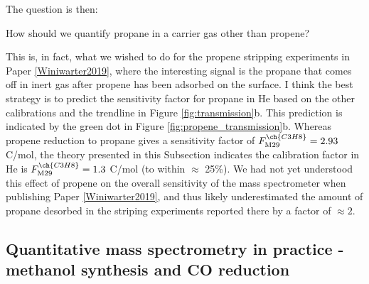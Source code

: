 The question is then: 
\begin{question} 
	How should we quantify propane in a carrier gas other than propene?
\end{question}
This is, in fact, what we wished to do for the propene stripping experiments in Paper \ref{Winiwarter2019}, where the interesting signal is the propane that comes off in inert gas after propene has been adsorbed on the surface. I think the best strategy is to predict the sensitivity factor for propane in He based on the other calibrations and the trendline in Figure \ref{fig:transmission}b. This prediction is indicated by the green dot in Figure \ref{fig:propene_transmission}b. Whereas propene reduction to propane gives a sensitivity factor of $F^{\ch{C3H8}}_\text{M29} = 2.93$ C/mol, the theory presented in this Subsection indicates the calibration factor in He is $F^{\ch{C3H8}}_\text{M29} = 1.3$ C/mol (to within $\approx$ 25\%). We had not yet understood this effect of propene on the overall sensitivity of the mass spectrometer when publishing Paper \ref{Winiwarter2019}, and thus likely underestimated the amount of propane desorbed in the striping experiments reported there by a factor of $\approx 2$.


\subsection{Quantitative mass spectrometry in practice - methanol synthesis and CO reduction}\label{subsec:in_practice}

